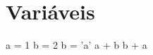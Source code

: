 
\chapter{Variáveis}%
\label{chapter:variables}

\begin{pythoncode}
    a = 1
    b = 2
    b = 'a'
    a + b
    b + a
\end{pythoncode}
